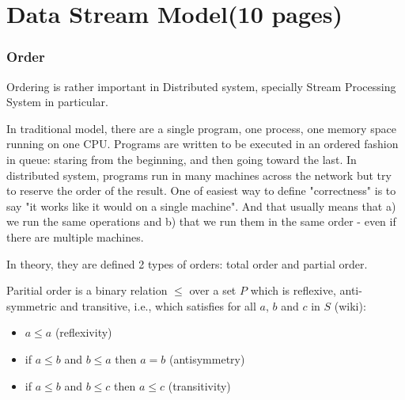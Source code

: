 
\chapter{Data Stream Model(10 pages)}

\ifpdf
    \graphicspath{{Chapter2/Figs/Raster/}{Chapter2/Figs/PDF/}{Chapter2/Figs/}}
\else
    \graphicspath{{Chapter2/Figs/Vector/}{Chapter2/Figs/}}
\fi


\subsection*{Order}
Ordering is rather important in Distributed system, specially Stream Processing System in particular. 

In traditional model, there are a single program, one process, one memory space running on one CPU. Programs are written to be executed in an ordered fashion in queue:  staring from the beginning, and then going  toward the last. In distributed system, programs run in many machines across the network but try to reserve the order of the result. One of easiest way to define "correctness" is to say "it works like it would on a single machine". And that usually means that a) we run the same operations and b) that we run them in the same order - even if there are multiple machines. \citep{Mikito:2014}

In theory, they are defined 2 types of orders: total order and partial order. 

\begin{defi}
 Paritial order is a binary relation $\leq$ over a set $P$ which is reflexive, anti-symmetric and transitive, i.e., which satisfies for all $a$, $b$ and $c$ in $S$ (wiki):
 
 \begin{itemize}
	 \item $a \leq a$ (reflexivity)
	\item  if $a \leq b$ and $b \leq a$ then $a = b$ (antisymmetry) 
	\item if $a \leq b$ and $b \leq c$ then $a \leq c$  (transitivity)
\end{itemize}
\end{defi}

